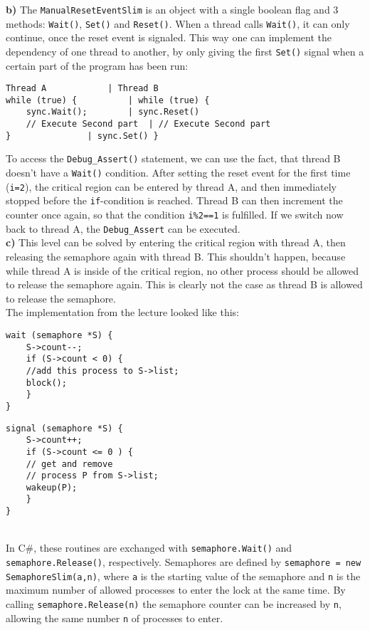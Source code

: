 \documentclass{article}
\begin{document}
\textbf{b)} The \texttt{ManualResetEventSlim} is an object with a single boolean
flag and 3 methods: \texttt{Wait()}, \texttt{Set()} and \texttt{Reset()}.
When a thread calls \texttt{Wait()}, it can only continue, once the reset event
is signaled. This way one can implement the dependency of one thread to another,
by only giving the first \texttt{Set()} signal when a certain part of the program
has been run:
\begin{lstlisting}
Thread A			| Thread B
while (true) {			| while (true) {
    sync.Wait();		| sync.Reset()
    // Execute Second part	| // Execute Second part
}				| sync.Set() }
\end{lstlisting}
To access the \texttt{Debug\_Assert()} statement, we can use the fact, that thread
B doesn't have a \texttt{Wait()} condition. After setting the reset event for the
first time (\texttt{i=2}), the critical region can be entered by thread A,
and then immediately stopped before the \texttt{if}-condition is reached. Thread
B can then increment the counter once again, so that the condition \texttt{i\%2==1}
is fulfilled. If we switch now back to thread A, the \texttt{Debug\_Assert} can be
executed. \\

\textbf{c)} This level can be solved by entering the critical region with thread A,
then releasing the semaphore again with thread B. This shouldn't happen, because
while thread A is inside of the critical region, no other process should be allowed
to release the semaphore again. This is clearly not the case as thread B is allowed
to release the semaphore. \\ The implementation from the lecture looked like this: \\
\begin{minipage}{.49\textwidth}
\begin{lstlisting}
wait (semaphore *S) {
    S->count--;
    if (S->count < 0) {
	//add this process to S->list;
	block(); 
    }
}
\end{lstlisting}
\end{minipage}
\begin{minipage}{.49\textwidth}
\begin{lstlisting}
signal (semaphore *S) {
    S->count++;
    if (S->count <= 0 ) {
	// get and remove
	// process P from S->list;
	wakeup(P);
    }
}
\end{lstlisting}
\end{minipage} \\
In C\#, these routines are exchanged with \texttt{semaphore.Wait()} and
\texttt{semaphore.Release()}, respectively.
Semaphores are defined by \texttt{semaphore = new SemaphoreSlim(a,n)}, where
\texttt{a} is the starting value of the semaphore and \texttt{n} is the maximum number of
allowed processes to enter the lock at the same time.
By calling \texttt{semaphore.Release(n)} the semaphore counter can be increased by
\texttt{n}, allowing the same number \texttt{n} of processes to enter. \\
\end{document}
